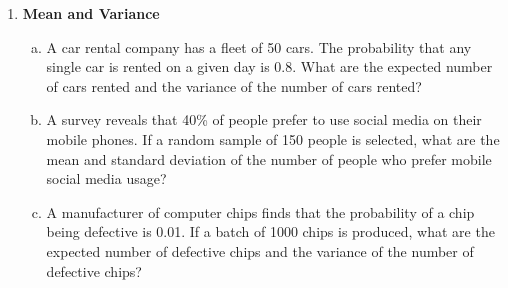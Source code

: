\documentclass{article}
\begin{document}
\begin{enumerate}
    \item \textbf{Mean and Variance}
    \begin{enumerate}[a)]
        \item A car rental company has a fleet of 50 cars. The probability that any single car is rented on a given day is 0.8. What are the expected number of cars rented and the variance of the number of cars rented?
        \item A survey reveals that 40\% of people prefer to use social media on their mobile phones. If a random sample of 150 people is selected, what are the mean and standard deviation of the number of people who prefer mobile social media usage?
        \item A manufacturer of computer chips finds that the probability of a chip being defective is 0.01. If a batch of 1000 chips is produced, what are the expected number of defective chips and the variance of the number of defective chips?
    \end{enumerate}
\end{enumerate}
\end{document}
